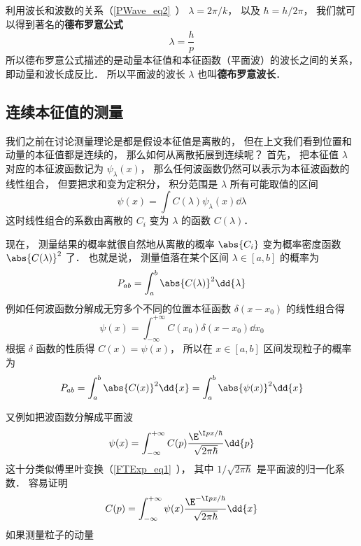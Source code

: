 利用波长和波数的关系（\autoref{PWave_eq2}~）
$\lambda = 2\pi/k$， 以及 $\hbar = h/2\pi$， 我们就可以得到著名的\textbf{德布罗意公式}
\begin{equation}
\lambda = \frac{h}{p}
\end{equation}
所以德布罗意公式描述的是动量本征值和本征函数（平面波）的波长之间的关系， 即动量和波长成反比． 所以平面波的波长 $\lambda$ 也叫\textbf{德布罗意波长}．

\subsection{连续本征值的测量}
我们之前在讨论测量理论是都是假设本征值是离散的， 但在上文我们看到位置和动量的本征值都是连续的， 那么如何从离散拓展到连续呢？ 首先， 把本征值 $\lambda$ 对应的本征波函数记为 $\psi_\lambda(x)$， 那么任何波函数仍然可以表示为本征波函数的线性组合， 但要把求和变为定积分， 积分范围是 $\lambda$ 所有可能取值的区间
\begin{equation}
\psi(x) = \int C(\lambda)\psi_\lambda(x) \dd{\lambda}
\end{equation}
这时线性组合的系数由离散的 $C_i$ 变为 $\lambda$ 的函数 $C(\lambda)$．

现在， 测量结果的概率就很自然地从离散的概率 $\abs{C_i}$ 变为概率密度函数 $\abs{C(\lambda)}^2$ 了． 也就是说， 测量值落在某个区间 $\lambda \in [a, b]$ 的概率为
\begin{equation}
P_{ab} = \int_a^b \abs{C(\lambda)}^2 \dd{\lambda}
\end{equation}
例如任何波函数分解成无穷多个不同的位置本征函数 $\delta(x-x_0)$ 的线性组合得
\begin{equation}
\psi(x) = \int_{-\infty}^{+\infty} C(x_0) \delta(x - x_0) \dd{x_0}
\end{equation}
根据 $\delta$ 函数的性质得 $C(x) = \psi(x)$， 所以在 $x \in [a, b]$ 区间发现粒子的概率为
\begin{equation}
P_{ab} = \int_a^b \abs{C(x)}^2\dd{x} = \int_a^b \abs{\psi(x)}^2\dd{x}
\end{equation}

又例如把波函数分解成平面波
\begin{equation}
\psi(x) = \int_{-\infty}^{+\infty} C(p)\frac{\E^{\I p x/\hbar}}{\sqrt{2\pi\hbar}} \dd{p}
\end{equation}
这十分类似傅里叶变换（\autoref{FTExp_eq1}~）， 其中 $1/\sqrt{2\pi\hbar}$ 是平面波的归一化系数． 容易证明
\begin{equation}
C(p) = \int_{-\infty}^{+\infty} \psi(x) \frac{\E^{-\I p x/\hbar}}{\sqrt{2\pi\hbar}} \dd{x}
\end{equation}
如果测量粒子的动量


